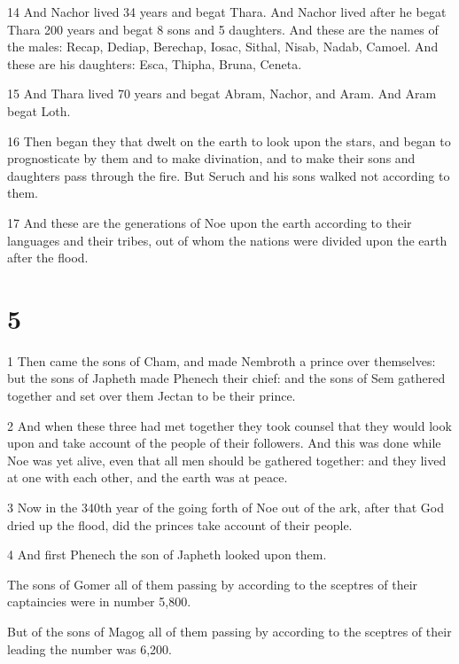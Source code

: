\par 14 And Nachor lived 34 years and begat Thara. And Nachor lived after he begat Thara 200 years and begat 8 sons and 5 daughters. And these are the names of the males: Recap, Dediap, Berechap, Iosac, Sithal, Nisab, Nadab, Camoel. And these are his daughters: Esca, Thipha, Bruna, Ceneta.

\par 15 And Thara lived 70 years and begat Abram, Nachor, and Aram. And Aram begat Loth.

\par 16 Then began they that dwelt on the earth to look upon the stars, and began to prognosticate by them and to make divination, and to make their sons and daughters pass through the fire. But Seruch and his sons walked not according to them.

\par 17 And these are the generations of Noe upon the earth according to their languages and their tribes, out of whom the nations were divided upon the earth after the flood.

\chapter{5}

\par 1 Then came the sons of Cham, and made Nembroth a prince over themselves: but the sons of Japheth made Phenech their chief: and the sons of Sem gathered together and set over them Jectan to be their prince.

\par 2 And when these three had met together they took counsel that they would look upon and take account of the people of their followers. And this was done while Noe was yet alive, even that all men should be gathered together: and they lived at one with each other, and the earth was at peace.

\par 3 Now in the 340th year of the going forth of Noe out of the ark, after that God dried up the flood, did the princes take account of their people.

\par 4 And first Phenech the son of Japheth looked upon them.

\par The sons of Gomer all of them passing by according to the sceptres of their captaincies were in number 5,800.

\par But of the sons of Magog all of them passing by according to the sceptres of their leading the number was 6,200.

